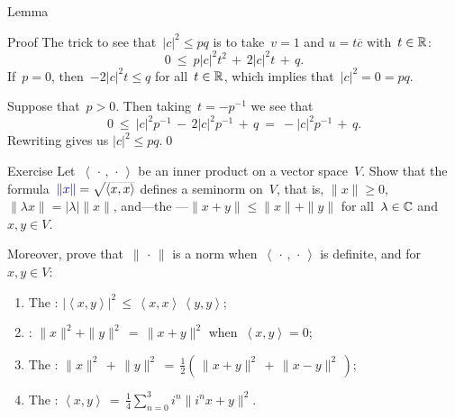 \documentclass[a]{subfiles}
\begin{document}
\begin{parsec}[hilb]
\begin{point}{Lemma}
\begin{point}{Proof}
The trick to see that~$\left|c\right|^2\leq pq$
is to
take~$v=1$ and $u=t\overline{c}$ with~$t\in \mathbb{R}$:
\begin{equation*}
0 \ \leq\ p\left|c\right|^2t^2
\,+\,2\left|c\right|^2t 
\,+\, q.
\end{equation*}
If~$p=0$, then~$-2\left|c\right|^2t \leq q $
for all~$t\in \mathbb{R}$,
which implies that~$\left|c\right|^2=0=pq$.

Suppose that~$p>0$.
Then taking~$t=-p^{-1}$ we see that
\begin{equation*}
0 \ \leq\ \left|c\right|^2p^{-1}
\,-\,2\left|c\right|^2p^{-1} 
\,+\, q \ = \ -\left|c\right|^2p^{-1}\,+\,q.
\end{equation*}
Rewriting gives us
 $\left|c\right|^2\leq pq$.\qed
\end{point}
\end{point}
\begin{point}{Exercise}%
Let~$\left<\,\cdot\,,\,\cdot\,\right>$
be an inner product on a vector space~$V$.
Show that
the formula~$\Define{\|x\|}=\smash{\sqrt{\left<x,x\right>}}$
defines a seminorm on~$V$,
that is,
$\|x\|\geq 0$,
$\|\lambda x\|=\left|\lambda\right|\|x\|$,
and---the ---$\|x+y\|\leq \|x\|+\|y\|$
for all~$\lambda\in \mathbb{C}$ and~$x,y\in V$.

Moreover, prove that~$\|\,\cdot\,\|$
is a norm when~$\left<\,\cdot\,,\,\cdot\,\right>$
is definite,
and for~$x,y\in V$:
\begin{enumerate}
\item
The :
$\left|\left<x,y\right>\right|^2\,\leq\, \left<x,x\right>
\,\left<y,y\right>$;
\item
{}:
$\|x\|^2+\|y\|^2\,=\,\|x+y\|^2$ when~$\left<x,y\right>=0$;
\item
The :
$\|x\|^2\,+\,
\|y\|^2
\,= \,
\frac{1}{2}(\,\|x+y\|^2\,+\,\|x-y\|^2\,)$;
\item
The :
$\left<x,y\right> \,=\, \frac{1}{4}\sum_{n=0}^3i^n\|i^nx+y\|^2$.
\end{enumerate}


\end{point}
\end{parsec}
\end{document}
